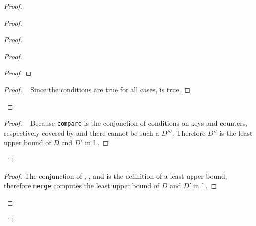 \documentclass[10pt, oneside]{article}   	%
\begin{document}
\begin{proof}
\begin{proof}
\begin{proof}
\begin{proof}
\begin{proof}
				\end{proof}
				
				\qedstep
				\begin{proof}
					\pf~ Since the conditions are true for all cases,  is true.
				\end{proof}
			\end{proof}
			
			\qedstep
			\begin{proof}
				\pf~ Because \texttt{compare} is the conjonction of conditions on keys and counters, respectively covered by  and  there cannot be such a $D'''$. Therefore $D''$ is the least upper bound of $D$ and $D'$ in $\mathds{L}$.
			\end{proof}
		\end{proof}
		
		\qedstep
		\begin{proof}
			The conjunction of , , and  is the definition of a least upper bound, therefore  \texttt{merge} computes the least upper bound of $D$ and $D'$ in $\mathds{L}$.
		\end{proof}	
	\end{proof}
	

\end{proof}
\end{document}
